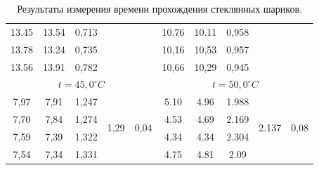 \documentclass[a4paper, 12pt]{article}%
\begin{document}
\begin{table}[h]
\begin{tabular}{|c|c|c|c|c||c|c|c|c|c|}
13.45 & 13.54 & 0,713 &                       &                       & 10.76 & 10.11 & 0,958 &                       &                       \\ \cline{1-3} \cline{6-8}
13.78 & 13.24 & 0,735 &                       &                       & 10,16 & 10,53 & 0,957 &                       &                       \\ \cline{1-3} \cline{6-8}
13.56 & 13.91 & 0,782 &                       &                       & 10,66 & 10,29 & 0,945 &                       &                       \\ \hline
\multicolumn{5}{|c|}{$t = 45,0^\circ C $}                                              & \multicolumn{5}{c|}{$t = 50,0^\circ C $}                                             \\ \hline
7,97  & 7,91  & 1,247 & \multirow{4}{*}{1,29} & \multirow{4}{*}{0,04} & 5.10 & 4.96 & 1.988 & \multirow{4}{*}{2.137} & \multirow{4}{*}{0,08} \\ \cline{1-3} \cline{6-8}
7,70  & 7,84  & 1,274 &                       &                       & 4.53 & 4.69 & 2.169 &                       &                       \\ \cline{1-3} \cline{6-8}
7,59  & 7,39  & 1,322 &                       &                       & 4.34 & 4.34 & 2.304 &                       &                       \\ \cline{1-3} \cline{6-8}
7,54  & 7,34  & 1,331 &                       &                       & 4.75 & 4.81 & 2.09 &                       &                       \\ \hline
\end{tabular}
\caption{Результаты измерения времени прохождения стеклянных шариков.}
\label{tab:glass_balls_measuring}
\end{table}
\end{document}
